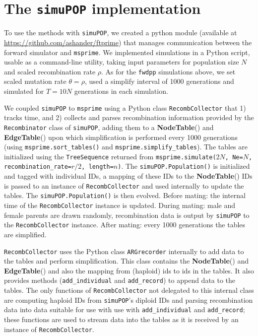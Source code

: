 \documentclass{article}
\newcommand{\simupop}{\texttt{simuPOP}}
\newcommand{\fwdpp}{\texttt{fwdpp}}
\newcommand{\msprime}{\texttt{msprime}}
\newcommand{\tnodetable}[1]{\mbox{\textbf{NodeTable}}(#1)}
\newcommand{\tedgetable}[1]{\mbox{\textbf{EdgeTable}}(#1)}
\begin{document}
\section{The \simupop{} implementation}
\label{ss:simupop}

To use the methods with \simupop{}, we created a python module
(available at \url{https://github.com/ashander/ftprime})
that manages communication between the forward simulator and \msprime{}.
We implemented simulations in a Python script, usable as a command-line utility,
taking input parameters for population size $N$ and scaled recombination rate $\rho$.
As for the \fwdpp{} simulations above, we set scaled mutation rate $\theta=\rho$,
used a simplify interval of 1000 generations and simulated for $T=10N$ generations in each
simulation.

We coupled \simupop{} to \msprime{} using a Python class \texttt{RecombCollector} that 1)
tracks time, and 2) collects and parses recombination information provided by
the \texttt{Recombinator} class of \simupop{}, adding them to a \tnodetable{} and
\tedgetable{} upon which simplification is performed every 1000 generations (using
\texttt{msprime.sort\_tables()} and \texttt{msprime.simplify\_tables}).
The tables are initialized using the \texttt{TreeSequence} returned from
\texttt{msprime.simulate($2N$, Ne=$N$, recombination\_rate=$r/2$, length=$n$)}.
The \texttt{simuPOP.Population()} is initialized and tagged with individual IDs,
a mapping of these IDs to the \tnodetable{} IDs is passed to
an instance of \texttt{RecombCollector} and used internally to update the tables.
The \texttt{simuPOP.Population()} is then evolved.
Before mating:
the internal time of the \texttt{RecombCollector} instance is updated.
During mating: male and female parents are drawn randomly, recombination data is
output by \simupop{} to the \texttt{RecombCollector} instance.
After mating: every 1000 generations the tables are simplified.

\texttt{RecombCollector} uses the Python class \texttt{ARGrecorder} internally
to add data to the tables and perform simplification.
This class contains the \tnodetable{} and \tedgetable{} and also the mapping from
(haploid) ids to ids in the tables.
It also provides methods (\texttt{add\_individual} and \texttt{add\_record})
to append data to the tables.
The only functions of
\texttt{RecombCollector} not delegated to this internal class are computing
haploid IDs from \simupop{}'s diploid IDs and parsing recombination data into
data suitable for use with use with \texttt{add\_individual} and
\texttt{add\_record}; these functions are used to stream data into the tables as
it is received by an instance of \texttt{RecombCollector}.
\end{document}
